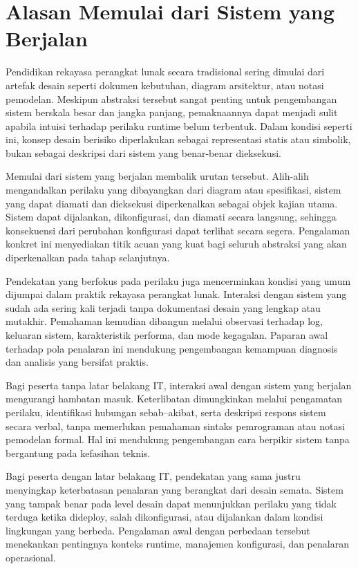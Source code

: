 \section{Alasan Memulai dari Sistem yang Berjalan}

Pendidikan rekayasa perangkat lunak secara tradisional sering dimulai dari
artefak desain seperti dokumen kebutuhan, diagram arsitektur, atau notasi
pemodelan. Meskipun abstraksi tersebut sangat penting untuk pengembangan sistem
berskala besar dan jangka panjang, pemaknaannya dapat menjadi sulit apabila
intuisi terhadap perilaku runtime belum terbentuk. Dalam kondisi seperti ini,
konsep desain berisiko diperlakukan sebagai representasi statis atau simbolik,
bukan sebagai deskripsi dari sistem yang benar-benar dieksekusi.

Memulai dari sistem yang berjalan membalik urutan tersebut. Alih-alih
mengandalkan perilaku yang dibayangkan dari diagram atau spesifikasi, sistem yang
dapat diamati dan dieksekusi diperkenalkan sebagai objek kajian utama. Sistem
dapat dijalankan, dikonfigurasi, dan diamati secara langsung, sehingga konsekuensi
dari perubahan konfigurasi dapat terlihat secara segera. Pengalaman konkret ini
menyediakan titik acuan yang kuat bagi seluruh abstraksi yang akan diperkenalkan
pada tahap selanjutnya.

Pendekatan yang berfokus pada perilaku juga mencerminkan kondisi yang umum
dijumpai dalam praktik rekayasa perangkat lunak. Interaksi dengan sistem yang
sudah ada sering kali terjadi tanpa dokumentasi desain yang lengkap atau mutakhir.
Pemahaman kemudian dibangun melalui observasi terhadap log, keluaran sistem,
karakteristik performa, dan mode kegagalan. Paparan awal terhadap pola penalaran
ini mendukung pengembangan kemampuan diagnosis dan analisis yang bersifat
praktis.

Bagi peserta tanpa latar belakang IT, interaksi awal dengan sistem yang berjalan
mengurangi hambatan masuk. Keterlibatan dimungkinkan melalui pengamatan perilaku,
identifikasi hubungan sebab–akibat, serta deskripsi respons sistem secara verbal,
tanpa memerlukan pemahaman sintaks pemrograman atau notasi pemodelan formal. Hal
ini mendukung pengembangan cara berpikir sistem tanpa bergantung pada kefasihan
teknis.

Bagi peserta dengan latar belakang IT, pendekatan yang sama justru menyingkap
keterbatasan penalaran yang berangkat dari desain semata. Sistem yang tampak benar
pada level desain dapat menunjukkan perilaku yang tidak terduga ketika
dideploy, salah dikonfigurasi, atau dijalankan dalam kondisi lingkungan yang
berbeda. Pengalaman awal dengan perbedaan tersebut menekankan pentingnya konteks
runtime, manajemen konfigurasi, dan penalaran operasional.

